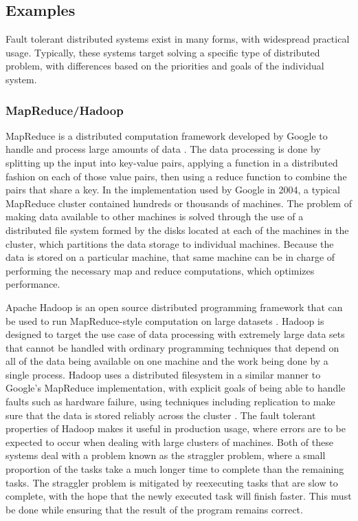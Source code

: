\documentclass[twoside]{report}
\begin{document}

\subsection{Examples}
Fault tolerant distributed systems exist in many forms, with widespread practical usage.
Typically, these systems target solving a specific type of distributed problem, with differences based on the priorities and goals of the individual system.

\subsubsection{MapReduce/Hadoop}
MapReduce is a distributed computation framework developed by Google to handle and process large amounts of data \cite{dean2004mapreduce}.
The data processing is done by splitting up the input into key-value pairs, applying a function in a distributed fashion on each of those value pairs, then using a reduce function to combine the pairs that share a key.
In the implementation used by Google in 2004, a typical MapReduce cluster contained hundreds or thousands of machines.
The problem of making data available to other machines is solved through the use of a distributed file system formed by the disks located at each of the machines in the cluster, which partitions the data storage to individual machines.
Because the data is stored on a particular machine, that same machine can be in charge of performing the necessary map and reduce computations, which optimizes performance.

Apache Hadoop is an open source distributed programming framework that can be used to run MapReduce-style computation on large datasets \cite{Hadoop}.
Hadoop is designed to target the use case of data processing with extremely large data sets that cannot be handled with ordinary programming techniques that depend on all of the data being available on one machine and the work being done by a single process.
Hadoop uses a distributed filesystem in a similar manner to Google's MapReduce implementation, with explicit goals of being able to handle faults such as hardware failure, using techniques including replication to make sure that the data is stored reliably across the cluster \cite{borthakur2007hadoop}.
The fault tolerant properties of Hadoop makes it useful in production usage, where errors are to be expected to occur when dealing with large clusters of machines.
Both of these systems deal with a problem known as the straggler problem, where a small proportion of the tasks take a much longer time to complete than the remaining tasks.
The straggler problem is mitigated by reexecuting tasks that are slow to complete, with the hope that the newly executed task will finish faster.
This must be done while ensuring that the result of the program remains correct.
\end{document}
